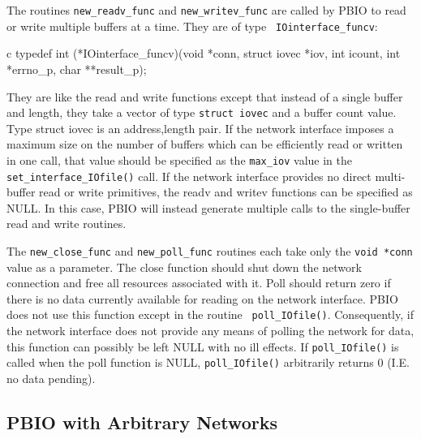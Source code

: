 \documentclass{article}
\begin{document}
The routines {\tt new\_readv\_func} and {\tt new\_writev\_func} are called by
PBIO to read or write multiple buffers at a time.  They are of type {\tt
IOinterface\_funcv}:
\begin{code}{c}
typedef int (*IOinterface_funcv)(void *conn, struct iovec *iov, int icount,
                                 int *errno_p, char **result_p);
\end{code}
They are like the read and write functions except that instead of a single
buffer and length, they take a vector of type {\tt struct iovec} and a buffer
count value. Type {struct iovec} is an address,length pair.  If the network
interface imposes a maximum size on the number of buffers which can be
efficiently read or written in one call, that value should be specified as the
{\tt max\_iov} value in the {\tt set\_interface\_IOfile()} call.  If the
network interface provides no direct multi-buffer read or write primitives,
the readv and writev functions can be specified as NULL.  In this case, PBIO
will instead generate multiple calls to the single-buffer read and write
routines. 

The {\tt new\_close\_func} and {\tt new\_poll\_func} routines each take only
the {\tt void *conn} value as a parameter.  The close function should shut
down the network connection and free all resources associated with it.  Poll
should return zero if there is no data currently available for reading on the
network interface.  PBIO does not use this function except in the routine {\tt
poll\_IOfile()}.  Consequently, if the network interface does not provide any
means of polling the network for data, this function can possibly be left NULL
with no ill effects.  If {\tt poll\_IOfile()} is called when the poll function
is NULL, {\tt poll\_IOfile()} arbitrarily returns 0 (I.E. no data pending).

\subsection{PBIO with Arbitrary Networks}
\end{document}
